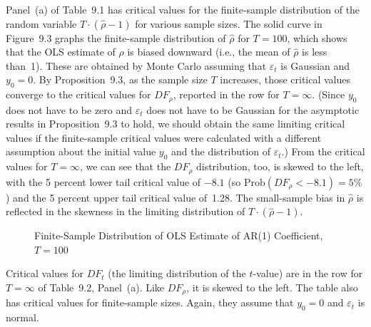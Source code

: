 Panel~(a) of Table~9.1 has critical values for the finite-sample distribution of the
random variable $T \cdot (\hat{\rho} - 1)$ for various sample sizes. The solid curve in Figure~9.3
graphs the finite-sample distribution of $\hat{\rho}$ for $T = 100$, which shows that the OLS
estimate of $\rho$ is biased downward (i.e., the mean of $\hat{\rho}$ is less than~1). These are
obtained by Monte Carlo assuming that $\varepsilon_t$ is Gaussian and $y_0 = 0$. By Proposition~9.3, as the sample size $T$ increases, those critical values converge to the critical
values for $DF_\rho$, reported in the row for $T = \infty$. (Since $y_0$ does
not have to be zero and $\varepsilon_t$ does not have to be Gaussian for the asymptotic results
in Proposition~9.3 to hold, we should obtain the same limiting critical values if the
finite-sample critical values were calculated with a different assumption about the
initial value $y_0$ and the distribution of $\varepsilon_t$.) From the critical values for $T = \infty$,
we can see that the $DF_\rho$ distribution, too, is skewed to the left, with the 5 percent
lower tail critical value of $-8.1$ (so $\text{Prob}(DF_\rho < -8.1) = 5\%$) and the 5 percent
upper tail critical value of~1.28. The small-sample bias in $\hat{\rho}$ is reflected in the
skewness in the limiting distribution of $T \cdot (\hat{\rho} - 1)$.

\begin{figure}[htbp]
\centering
{}
\caption{Finite-Sample Distribution of OLS Estimate of AR(1) Coefficient, $T = 100$}
\label{fig:9.3}
\end{figure}

Critical values for $DF_t$ (the limiting distribution of the $t$-value) are in the row
for $T = \infty$ of Table~9.2, Panel~(a). Like $DF_\rho$, it is skewed to the left. The table
also has critical values for finite-sample sizes. Again, they assume that $y_0 = 0$ and
$\varepsilon_t$ is normal.

